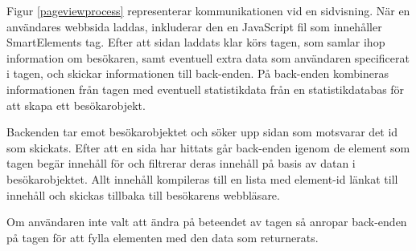 Figur \ref{pageviewprocess} representerar kommunikationen vid en sidvisning. När en användares webbsida laddas, inkluderar den en JavaScript fil som innehåller SmartElements tag. Efter att sidan laddats klar körs tagen, som samlar ihop information om besökaren, samt eventuell extra data som användaren specificerat i tagen, och skickar informationen till back-enden. På back-enden kombineras informationen från tagen med eventuell statistikdata från en statistikdatabas för att skapa ett besökarobjekt.

Backenden tar emot besökarobjektet och söker upp sidan som motsvarar det id som skickats. Efter att en sida har hittats går back-enden igenom de element som tagen begär innehåll för och filtrerar deras innehåll på basis av datan i besökarobjektet. Allt innehåll kompileras till en lista med element-id länkat till innehåll och skickas tillbaka till besökarens webbläsare.

Om användaren inte valt att ändra på beteendet av tagen så anropar back-enden på tagen för att fylla elementen med den data som returnerats.
